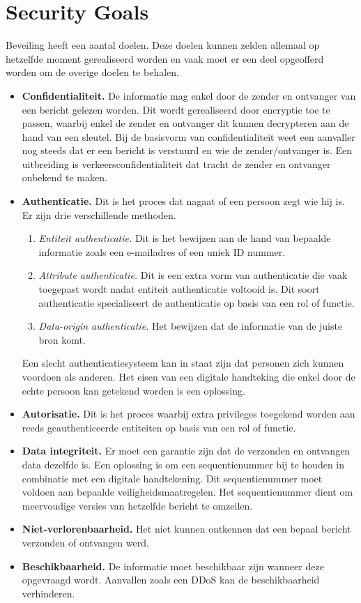	\section{Security Goals}
	Beveiling heeft een aantal doelen. Deze doelen kunnen zelden allemaal op hetzelfde moment gerealiseerd worden en vaak moet er een deel opgeofferd worden om de overige doelen te behalen.
	\begin{itemize}
		\item \textbf{Confidentialiteit.} De informatie mag enkel door de zender en ontvanger van een bericht gelezen worden. Dit wordt gerealiseerd door encryptie toe te passen, waarbij enkel de zender en ontvanger dit kunnen decrypteren aan de hand van een sleutel. Bij de basisvorm van confidentialiteit weet een aanvaller nog steeds dat er een bericht is verstuurd en wie de zender/ontvanger is. Een uitbreiding is verkeersconfidentialiteit dat tracht de zender en ontvanger onbekend te maken.
		\item \textbf{Authenticatie.} Dit is het proces dat nagaat of een persoon zegt wie hij is. Er zijn drie verschillende methoden.
		\begin{enumerate}
			\item \textit{Entiteit authenticatie.} Dit is het bewijzen aan de hand van bepaalde informatie zoals een e-mailadres of een uniek ID nummer.
			\item \textit{Attribute authenticatie.} Dit is een extra vorm van authenticatie die vaak toegepast wordt nadat entiteit authenticatie voltooid is. Dit soort authenticatie specialiseert de authenticatie op basis van een rol of functie.
			\item \textit{Data-origin authenticatie.} Het bewijzen dat de informatie van de juiste bron komt. 
		\end{enumerate}
	    Een slecht authenticatiesysteem kan in staat zijn dat personen zich kunnen voordoen als anderen. Het eisen van een digitale handteking die enkel door de echte persoon kan getekend worden is een oplossing.
		\item \textbf{Autorisatie.} Dit is het proces waarbij extra privileges toegekend worden aan reeds geauthenticeerde entiteiten op basis van een rol of functie.
		\item \textbf{Data integriteit.} Er moet een garantie zijn dat de verzonden en ontvangen data dezelfde is. Een oplossing is om een sequentienummer bij te houden in combinatie met een digitale handtekening. Dit sequentienummer moet voldoen aan bepaalde veiligheidsmaatregelen. Het sequentienummer dient om meervoudige versies van hetzelfde bericht te omzeilen.
		
		\item \textbf{Niet-verlorenbaarheid.} Het niet kunnen ontkennen dat een bepaal bericht verzonden of ontvangen werd. 
		
		\item \textbf{Beschikbaarheid.} De informatie moet beschikbaar zijn wanneer deze opgevraagd wordt. Aanvallen zoals een DDoS kan de beschikbaarheid verhinderen.
	\end{itemize}

